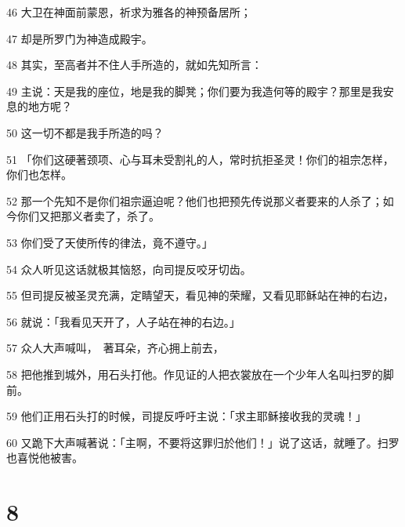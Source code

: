 \par 46 大卫在神面前蒙恩，祈求为雅各的神预备居所；
\par 47 却是所罗门为神造成殿宇。
\par 48 其实，至高者并不住人手所造的，就如先知所言：
\par 49 主说：天是我的座位，地是我的脚凳；你们要为我造何等的殿宇？那里是我安息的地方呢？
\par 50 这一切不都是我手所造的吗？
\par 51 「你们这硬著颈项、心与耳未受割礼的人，常时抗拒圣灵！你们的祖宗怎样，你们也怎样。
\par 52 那一个先知不是你们祖宗逼迫呢？他们也把预先传说那义者要来的人杀了；如今你们又把那义者卖了，杀了。
\par 53 你们受了天使所传的律法，竟不遵守。」
\par 54 众人听见这话就极其恼怒，向司提反咬牙切齿。
\par 55 但司提反被圣灵充满，定睛望天，看见神的荣耀，又看见耶稣站在神的右边，
\par 56 就说：「我看见天开了，人子站在神的右边。」
\par 57 众人大声喊叫，　著耳朵，齐心拥上前去，
\par 58 把他推到城外，用石头打他。作见证的人把衣裳放在一个少年人名叫扫罗的脚前。
\par 59 他们正用石头打的时候，司提反呼吁主说：「求主耶稣接收我的灵魂！」
\par 60 又跪下大声喊著说：「主啊，不要将这罪归於他们！」说了这话，就睡了。扫罗也喜悦他被害。

\chapter{8}

